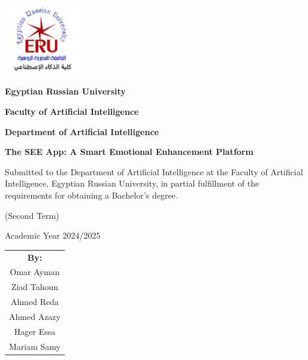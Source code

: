 ﻿\documentclass[12pt,a4paper]{article}
\author{Omar Ayman, Ziad Tahoun, Ahmed Reda, Ahmed Azazy, Hager Essa, Mariam Samy}
\date{Academic Year 2024/2025}
\begin{document}
\begin{titlepage}
    \centering
    \vspace*{-2cm}

    \includegraphics[width=0.25\textwidth]{logo/erulogo.jpg}\par
    \vspace{0.3cm}
    {\large \textbf{Egyptian Russian University}}\par
    {\LARGE {}}\par
    \vspace{0.1cm}
    {\large \textbf{Faculty of Artificial Intelligence}}\par
    \vspace{0.1cm}
    {\large \textbf{Department of Artificial Intelligence}}\par
    \vspace{0.5cm}

    {\huge \textbf{The SEE App: A Smart Emotional Enhancement Platform}}\par
    \vspace{0.2cm}
    {\LARGE {}}\par
    {\LARGE {}}\par
    \vspace{0.6cm}

    {\small Submitted to the Department of Artificial Intelligence at the Faculty of Artificial Intelligence, Egyptian Russian University, in partial fulfillment of the requirements for obtaining a Bachelor's degree.}\par
    \vspace{0.4cm}
    {\normalsize (Second Term)}\par
    {\normalsize Academic Year 2024/2025}\par
    \vspace{0.6cm}

    \begin{tabular}{c}
        \textbf{By:} \\
        Omar Ayman \\
        Ziad Tahoun \\
        Ahmed Reda \\
        Ahmed Azazy \\
        Hager Essa \\
        Mariam Samy \\
    \end{tabular}\par
    \vspace{0.3cm}


\end{titlepage}
\end{document}
